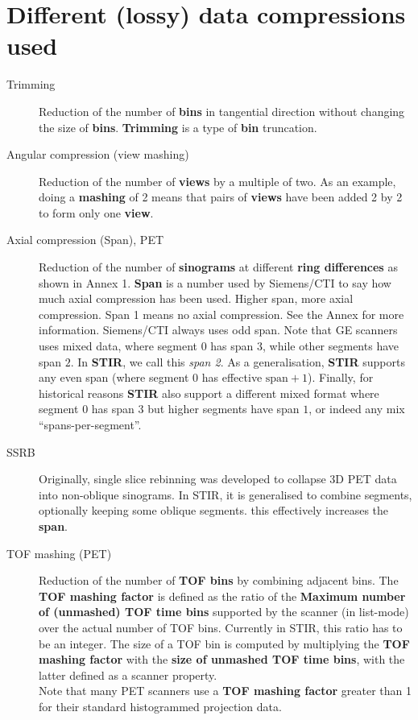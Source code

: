 \documentclass{article}
\begin{document}
\section*{Different (lossy) data compressions used}
\begin{description}

\item[Trimming] 
Reduction of the number of \textbf{bins} in tangential direction without 
changing the size of \textbf{bins}. \textbf{Trimming} is a type of \textbf{bin} 
truncation.

\item[Angular compression (view mashing)] 
Reduction of the number of \textbf{views} by a multiple of two. As 
an example, doing a \textbf{mashing} of 2 means that pairs of \textbf{views} 
have been added 2 by 2 to form only one \textbf{view}.

\item[Axial compression (Span), PET] 
Reduction of the number of \textbf{sinograms} at different \textbf{ring 
differences} as shown in Annex 1. \textbf{Span} is a number used by 
Siemens/CTI to say how much axial compression has been used. 
Higher span, more axial compression. Span 1 means 
no axial compression. See the Annex for more information.
Siemens/CTI always uses odd span. 
Note that GE scanners uses mixed data, 
where segment $0$ has span $3$, while other segments have span $2$. 
In \textbf{STIR}, we call this \textit{span 2}. As a generalisation,
\textbf{STIR} supports any even span (where segment $0$ has effective
$\mathrm{span}+1$).
Finally, for historical reasons \textbf{STIR} also support a different mixed
format where segment $0$ has span $3$ but higher segments have span $1$,
or indeed any mix ``spans-per-segment''.

\item[SSRB]
Originally, single slice rebinning was developed to collapse 3D PET data into non-oblique sinograms.
In STIR, it is generalised to combine segments, optionally keeping some oblique segments.
this effectively increases the \textbf{span}.

\item[TOF mashing (PET)]
Reduction of the number of \textbf{TOF bins} by combining adjacent bins. The \textbf{TOF mashing factor}
is defined as the ratio of the \textbf{Maximum number of (unmashed) TOF time bins} supported
by the scanner (in list-mode) over the actual number of TOF bins. Currently in STIR, this
ratio has to be an integer. The size of a TOF bin is computed by multiplying the
\textbf{TOF mashing factor} with the \textbf{size of unmashed TOF time bins}, with the latter
defined as a scanner property.\\
Note that many PET scanners use a \textbf{TOF mashing factor} greater than 1
for their standard histogrammed projection data.

\end{description}
\end{document}
